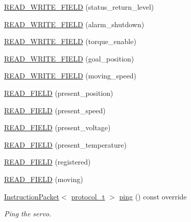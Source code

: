 \begin{DoxyCompactItemize}
\item 
\hyperlink{classdynamixel_1_1servos_1_1_servo_adff1f1c1cab4ff1313f38801dd793b84}{R\+E\+A\+D\+\_\+\+W\+R\+I\+T\+E\+\_\+\+F\+I\+E\+L\+D} (status\+\_\+return\+\_\+level)
\item 
\hyperlink{classdynamixel_1_1servos_1_1_servo_a282f154ebc133a075fbb32b0497fbac7}{R\+E\+A\+D\+\_\+\+W\+R\+I\+T\+E\+\_\+\+F\+I\+E\+L\+D} (alarm\+\_\+shutdown)
\item 
\hyperlink{classdynamixel_1_1servos_1_1_servo_a38f0ba19d8706cdffe1931fd0b803360}{R\+E\+A\+D\+\_\+\+W\+R\+I\+T\+E\+\_\+\+F\+I\+E\+L\+D} (torque\+\_\+enable)
\item 
\hyperlink{classdynamixel_1_1servos_1_1_servo_a62e1e0a0ba01efa5d5d7f4d310a70792}{R\+E\+A\+D\+\_\+\+W\+R\+I\+T\+E\+\_\+\+F\+I\+E\+L\+D} (goal\+\_\+position)
\item 
\hyperlink{classdynamixel_1_1servos_1_1_servo_a3928c0f3a88838a01c6cdc1747b362a0}{R\+E\+A\+D\+\_\+\+W\+R\+I\+T\+E\+\_\+\+F\+I\+E\+L\+D} (moving\+\_\+speed)
\item 
\hyperlink{classdynamixel_1_1servos_1_1_servo_af5e933f746897f67e33f7efee3b58fca}{R\+E\+A\+D\+\_\+\+F\+I\+E\+L\+D} (present\+\_\+position)
\item 
\hyperlink{classdynamixel_1_1servos_1_1_servo_a01a3cc7e52aba7cf772434d3642c06e3}{R\+E\+A\+D\+\_\+\+F\+I\+E\+L\+D} (present\+\_\+speed)
\item 
\hyperlink{classdynamixel_1_1servos_1_1_servo_a3b7845daafbf75fdfcf3d26d9bcc0dbf}{R\+E\+A\+D\+\_\+\+F\+I\+E\+L\+D} (present\+\_\+voltage)
\item 
\hyperlink{classdynamixel_1_1servos_1_1_servo_a0d3fbe926d5c4403f3b9f06d596daeb2}{R\+E\+A\+D\+\_\+\+F\+I\+E\+L\+D} (present\+\_\+temperature)
\item 
\hyperlink{classdynamixel_1_1servos_1_1_servo_a615444eaaddfc69de68bf2e65c0751e8}{R\+E\+A\+D\+\_\+\+F\+I\+E\+L\+D} (registered)
\item 
\hyperlink{classdynamixel_1_1servos_1_1_servo_a891d5b76b43a6743090fae54261214ce}{R\+E\+A\+D\+\_\+\+F\+I\+E\+L\+D} (moving)
\item 
\hyperlink{classdynamixel_1_1_instruction_packet}{Instruction\+Packet}$<$ \hyperlink{classdynamixel_1_1servos_1_1_servo_a7718c41cee1187b992836f4b6bad8a38}{protocol\+\_\+t} $>$ \hyperlink{classdynamixel_1_1servos_1_1_servo_a9a471486d0ec100d485c5fb4af114d38}{ping} () const override
\begin{DoxyCompactList}\small\item\em Ping the servo. \end{DoxyCompactList}\item 

\end{DoxyCompactItemize}
